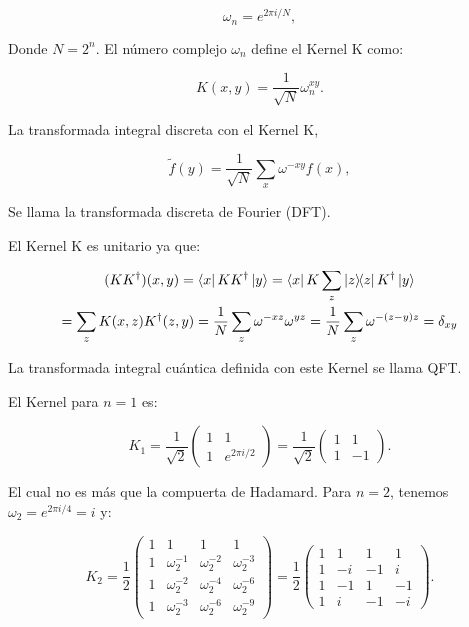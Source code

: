 \begin{equation}
    \omega_n = e^{2\pi i/N} ,
\end{equation}

Donde $N = 2^n$. El número complejo $\omega_n$ define el Kernel K como:

\begin{equation}
    K(x,y) = \frac{1}{\sqrt{N}} \omega_n^{x y} .
\end{equation}

La transformada integral discreta con el Kernel K,

\begin{equation}
    \tilde{f}(y) = \frac{1}{\sqrt{N}} \sum\limits_x \omega^{-x y} f(x) ,
\end{equation}

Se llama la transformada discreta de Fourier (DFT).

El Kernel K es unitario ya que:

\begin{multline}
    (K K^\dagger)(x,y) = \bra{x} K K^\dagger \ket{y}
    = \bra{x} K \sum\limits_z \ketbra{z}{z} K^\dagger \ket{y} \\
    = \sum\limits_z K(x,z) K^\dagger(z,y) 
    = \frac{1}{N} \sum\limits_z \omega^{-x z} \omega^{y z} 
    = \frac{1}{N} \sum\limits_z \omega^{- (z-y) z} 
    = \delta_{x y}
\end{multline}

La transformada integral cuántica definida con este Kernel se llama QFT.

El Kernel para $n = 1$ es:

\begin{equation}
    K_1 = \frac{1}{\sqrt{2}}
    \begin{pmatrix}
        1 & 1 \\
        1 & e^{2\pi i/2}
    \end{pmatrix} =
    \frac{1}{\sqrt{2}}
    \begin{pmatrix}
        1 & 1 \\
        1 & -1
    \end{pmatrix} .
\end{equation}

El cual no es más que la compuerta de Hadamard. Para $n = 2$, tenemos $\omega_2 = e^{2\pi i/4} = i$ y:

\begin{equation}
    K_2 = \frac{1}{2}
    \begin{pmatrix}
        1 & 1 & 1 & 1 \\
        1 & \omega_2^{-1} & \omega_2^{-2} & \omega_2^{-3} \\
        1 & \omega_2^{-2} & \omega_2^{-4} & \omega_2^{-6} \\
        1 & \omega_2^{-3} & \omega_2^{-6} & \omega_2^{-9}
    \end{pmatrix} =
    \frac{1}{2}
    \begin{pmatrix}
        1 & 1 & 1 & 1 \\
        1 & -i & -1 & i \\
        1 & -1 & 1 & -1 \\
        1 & i & -1 & -i
    \end{pmatrix} .
\end{equation}

